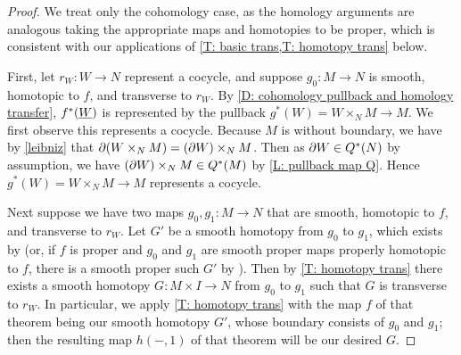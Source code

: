 \begin{proof}
	We treat only the cohomology case, as the homology arguments are analogous taking the appropriate maps and homotopies to be proper, which is consistent with our applications of \cref{T: basic trans,T: homotopy trans} below.

	First, let $r_W \colon W \to N$ represent a cocycle, and suppose $g_0 \colon M \to N$ is smooth, homotopic to $f$, and transverse to $r_W$.
	By \cref{D: cohomology pullback and homology transfer}, $f^*(\underline{W})$ is represented by the pullback $g^*(W) = W \times_N M \to M$.
	We first observe this represents a cocycle.
	Because  $M$ is without boundary, we have by \cref{leibniz} that $\partial(W\times_N M) = (\partial W) \times_N M$.
	Then as $\partial W \in Q^*(N)$ by assumption, we have $(\partial W) \times_N M \in Q^*(M)$ by \cref{L: pullback map Q}.
	Hence $g^*(W) = W \times_N M \to M$ represents a cocycle.

	Next suppose we have two maps $g_0, g_1 \colon M \to N$ that are smooth, homotopic to $f$, and transverse to $r_W$.
	Let $G'$ be a smooth homotopy from $g_0$ to $g_1$, which exists by \cite[Proposition 9.2.33]{MaDo92} (or, if $f$ is proper and $g_0$ and $g_1$ are smooth proper maps properly homotopic to $f$, there is a smooth proper such $G'$ by \cite[Proposition 9.2.35]{MaDo92}).
	Then by \cref{T: homotopy trans} there exists a smooth homotopy $G \colon M \times I \to N$ from $g_0$ to $g_1$ such that $G$ is transverse to $r_W$.
	In particular, we apply \cref{T: homotopy trans} with the map $f$ of that theorem being our smooth homotopy $G'$, whose boundary consists of $g_0$ and $g_1$; then the resulting map $h(-,1)$ of that theorem will be our desired $G$.


\end{proof}
